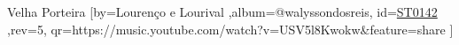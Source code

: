 \beginsong
{Velha Porteira %
}[by={Lourenço e Lourival %
},album={@walyssondosreis},
id={\href{https://music.youtube.com/watch?v=USV5l8Kwokw&feature=share %
}{ST0142 %
}},rev={5}, %
qr={https://music.youtube.com/watch?v=USV5l8Kwokw&feature=share %
}]

